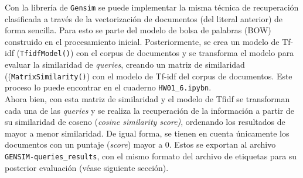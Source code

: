 Con la librería de \texttt{Gensim} se puede implementar la misma técnica de recuperación clasificada a través de la vectorización de documentos (del literal anterior) de forma sencilla. Para esto se parte del modelo de bolsa de palabras (BOW) construido en el procesamiento inicial. Posteriormente, se crea un modelo de Tf-idf (\texttt{TfidfModel()}) con el corpus de documentos y se transforma el modelo para evaluar la similaridad de \textit{queries}, creando un matriz de similaridad ((\texttt{MatrixSimilarity()}) con el modelo de Tf-idf del corpus de documentos. Este proceso lo puede encontrar en el cuaderno \texttt{HW01\_6.ipybn}. \\

Ahora bien, con esta matriz de similaridad y el modelo de Tfidf se transforman cada una de las \textit{queries} y se realiza la recuperación de la información a partir de su similaridad de coseno (\textit{cosine similarity score)}, ordenando los resultados de mayor a menor similaridad. De igual forma, se tienen en cuenta únicamente los documentos con un puntaje (\textit{score}) mayor a 0. Estos se exportan al archivo \texttt{GENSIM-queries\_results}, con el mismo formato del archivo de etiquetas para su posterior evaluación (véase siguiente sección).